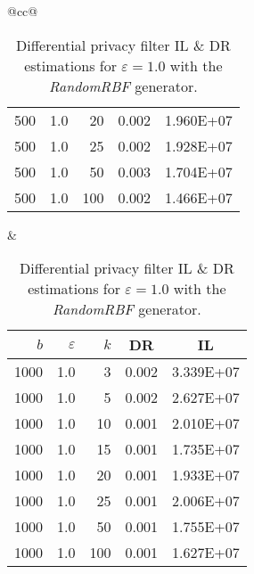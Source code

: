 \begin{table}[H]
\begin{tabular}{@{}cc@{}}
\begin{tabular}{@{}rrrrr@{}}
			500 & 1.0 & 20  & 0.002 & 1.960E+07 \\
			500 & 1.0 & 25  & 0.002 & 1.928E+07 \\
			500 & 1.0 & 50  & 0.003 & 1.704E+07 \\
			500 & 1.0 & 100 & 0.002 & 1.466E+07 \\ \bottomrule
		\end{tabular}
		&
		\begin{tabular}{@{}rrrrr@{}}
			\toprule
			$b$ & $\varepsilon$ & $k$ & \multicolumn{1}{c}{DR} & \multicolumn{1}{c}{IL} \\ \midrule
			1000 & 1.0 & 3   & 0.002 & 3.339E+07 \\
			1000 & 1.0 & 5   & 0.002 & 2.627E+07 \\
			1000 & 1.0 & 10  & 0.001 & 2.010E+07 \\
			1000 & 1.0 & 15  & 0.001 & 1.735E+07 \\
			1000 & 1.0 & 20  & 0.001 & 1.933E+07 \\
			1000 & 1.0 & 25  & 0.001 & 2.006E+07 \\
			1000 & 1.0 & 50  & 0.001 & 1.755E+07 \\
			1000 & 1.0 & 100 & 0.001 & 1.627E+07 \\ \bottomrule
		\end{tabular}
	\end{tabular}
	\caption[Differential privacy filter DR \& IL estimations (RandomRBF), $\varepsilon = 1.0$.]{Differential privacy filter IL \& DR estimations for $\varepsilon = 1.0$ with the \textit{RandomRBF} generator.}
\end{table}

